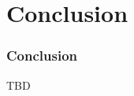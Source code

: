 \documentclass[xcolor=dvipsnames,hyperref={CJKbookmarks=true}]{beamer}
\begin{document}
\begin{frame}[t]
\begin{columns}
\begin{column}{0.5\linewidth}
\end{column}%
\begin{column}{0.5\linewidth}
	\centering
\end{column}
\end{columns}
\end{frame}

\section{Conclusion}
\begin{frame}[t]\frametitle{Conclusion}
    
TBD

\end{frame}
\end{document}
